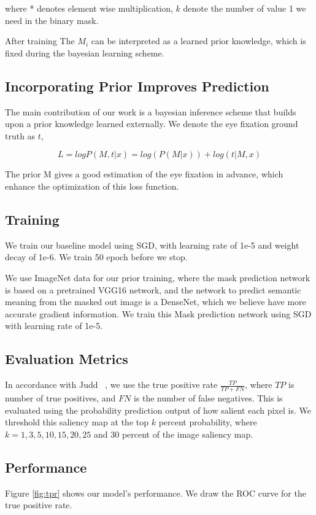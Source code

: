 \documentclass[10pt,twocolumn,letterpaper]{article}
\begin{document}
 where * denotes element wise multiplication, $k$ denote the number of value 1 we need in the binary mask.
 
 After training The $M_i$ can be interpreted as a learned prior knowledge, which is fixed during the bayesian learning scheme.
 
 \subsection{Incorporating Prior Improves Prediction}
 
 The main contribution of our work is a bayesian inference scheme that builds upon a prior knowledge learned externally. We denote the eye fixation ground truth as $t$, 
 
 $$L = logP(M, t|x) = log(P(M|x)) + log(t|M, x)$$
 
 The prior M gives a good estimation of the eye fixation in advance, which enhance the optimization of this loss function.
 
 
 
\subsection{Training}
We train our baseline model using SGD, with learning rate of 1e-5 and weight decay of 1e-6. We train 50 epoch before we stop.

We use ImageNet data for our prior training, where the mask prediction network is based on a pretrained VGG16 network, and the network to predict semantic meaning from the masked out image is a DenseNet, which we believe have more accurate gradient information. We train this Mask prediction network using SGD with learning rate of 1e-5.


\subsection{Evaluation Metrics}

In accordance with Judd \etal~\cite{Judd}, we use the true positive rate
$\frac{TP}{TP + FN}$, where $TP$ is number of true positives, and $FN$ is the
number of false negatives. This is evaluated using the probability prediction
output of how salient each pixel is. We threshold this saliency map at the top
$k$ percent probability, where $k=1, 3, 5, 10, 15, 20, 25$ and 30 percent of
the image saliency map. 

\subsection{Performance}
Figure \ref{fig:tpr} shows our model's performance. We draw the ROC curve for the true
positive rate. 
\end{document}

